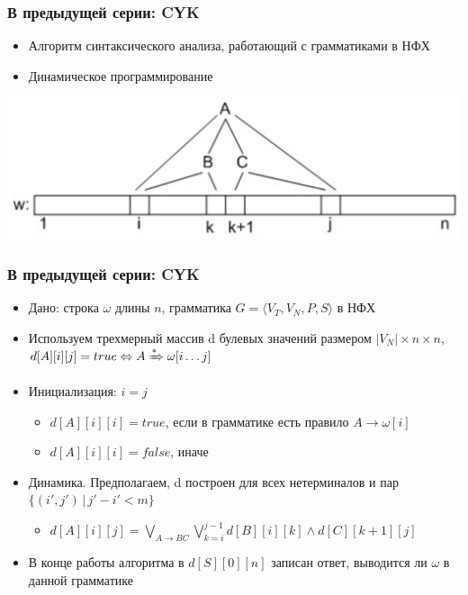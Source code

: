 \documentclass{beamer}
\newcommand{\derive}[0]{\xRightarrow[]{*}}
\begin{document}
\begin{frame}[fragile]
  \transwipe[direction=90]
  \frametitle{В предыдущей серии: CYK}
  \begin{itemize}
      \item Алгоритм синтаксического анализа, работающий с грамматиками в НФХ
      \item Динамическое программирование
  \end{itemize}

  \begin{center}
    \includegraphics[width=\textwidth]{pics/CYK.png}  
  \end{center}
\end{frame}


\begin{frame}[fragile]
  \transwipe[direction=90]
  \frametitle{В предыдущей серии: CYK}
  \begin{itemize}
      \item Дано: строка $\omega$ длины $n$, грамматика $G = \langle V_T, V_N, P, S\rangle$ в НФХ
      \item Используем трехмерный массив d булевых значений размером $|V_N| \times n \times n$, $d[A][i][j] = true \Leftrightarrow A \derive \omega[i \dots j]$
      \item Инициализация: $i = j$
      \begin{itemize}
        \item $d[A][i][i] = true$, если в грамматике есть правило $A \rightarrow \omega[i]$
        \item $d[A][i][i] = false$, иначе
      \end{itemize}
      \item Динамика. Предполагаем, d построен для всех нетерминалов и пар $\{(i', j') \, | \, j' - i' < m \}$
      \begin{itemize}
        \item $d[A][i][j] = \bigvee_{A\rightarrow BC}^{}{\bigvee_{k=i}^{j-1}{d[B][i][k] \wedge d[C][k+1][j]}}$
      \end{itemize}
      \item В конце работы алгоритма в $d[S][0][n]$ записан ответ, выводится ли $\omega$ в данной грамматике
  \end{itemize}
\end{frame}
\end{document}
